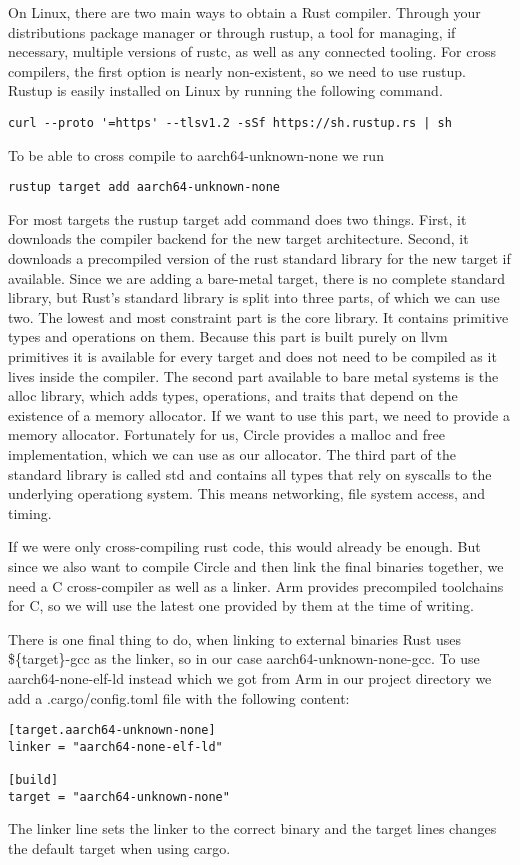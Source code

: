 On Linux, there are two main ways to obtain a Rust compiler.
Through your distributions package manager or through rustup,
a tool for managing, if necessary, multiple versions of rustc, as well as any connected tooling.
For cross compilers, the first option is nearly non-existent, so we need to use rustup.
Rustup is easily installed on Linux by running the following command.
\begin{verbatim}
curl --proto '=https' --tlsv1.2 -sSf https://sh.rustup.rs | sh
\end{verbatim}
To be able to cross compile to aarch64-unknown-none we run
\begin{verbatim}
rustup target add aarch64-unknown-none
\end{verbatim}
For most targets the rustup target add command does two things.
First, it downloads the compiler backend for the new target architecture.
Second, it downloads a precompiled version of the rust standard library for the new target if available.
Since we are adding a bare-metal target, there is no complete standard library, but Rust's standard library is split into three parts, of which we can use two.
The lowest and most constraint part is the core library.
It contains primitive types and operations on them.
Because this part is built purely on llvm primitives it is available for every target and does not need to be compiled as it lives inside the compiler.
The second part available to bare metal systems is the alloc library, which adds types, operations, and traits that depend on the existence of a memory allocator.
If we want to use this part, we need to provide a memory allocator.
Fortunately for us, Circle provides a malloc and free implementation, which we can use as our allocator.
The third part of the standard library is called std and contains all types that rely on syscalls to the underlying operationg system.
This means networking, file system access, and timing.

If we were only cross-compiling rust code, this would already be enough.
But since we also want to compile Circle and then link the final binaries together, we need a C cross-compiler as well as a linker.
Arm provides precompiled toolchains for C, so we will use the latest one provided by them at the time of writing.

There is one final thing to do, when linking to external binaries Rust uses \$\{target\}-gcc as the linker, so in our case aarch64-unknown-none-gcc.
To use aarch64-none-elf-ld instead which we got from Arm in our project directory we add a .cargo/config.toml file with the following content:
\begin{lstlisting}
[target.aarch64-unknown-none]
linker = "aarch64-none-elf-ld"

[build]
target = "aarch64-unknown-none"
\end{lstlisting}
The linker line sets the linker to the correct binary and the target lines changes the default target when using cargo.

